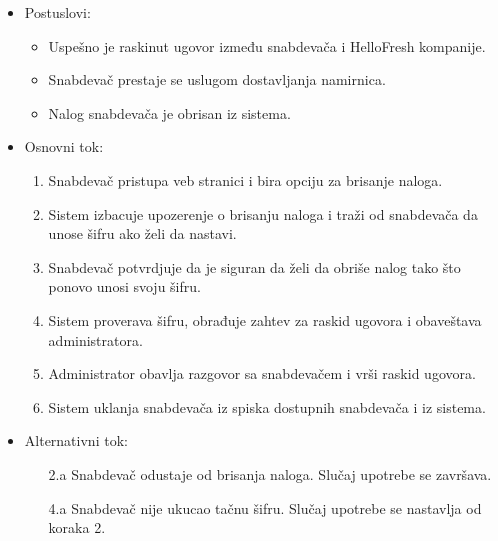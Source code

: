 \begin{itemize}
\begin{itemize}
        \end{itemize}
    \item Postuslovi:
        \begin{itemize}
            \item Uspešno je raskinut ugovor između snabdevača i HelloFresh kompanije.
            \item Snabdevač prestaje se uslugom dostavljanja namirnica.
            \item Nalog snabdevača je obrisan iz sistema.
        \end{itemize}
    \item Osnovni tok:
        \begin{enumerate}
            \item Snabdevač pristupa veb stranici i bira opciju za brisanje naloga.
            \item Sistem izbacuje upozerenje o brisanju naloga i traži od snabdevača da unose šifru ako želi da nastavi.
            \item Snabdevač potvrdjuje da je siguran da želi da obriše nalog tako što ponovo unosi svoju šifru.
            \item Sistem proverava šifru, obrađuje zahtev za raskid ugovora i obaveštava administratora.
            \item Administrator obavlja razgovor sa snabdevačem i vrši raskid ugovora.
            \item Sistem uklanja snabdevača iz spiska dostupnih snabdevača i iz sistema.
        \end{enumerate}
    \item Alternativni tok:
        \begin{itemize}
            \item[2.a] Snabdevač odustaje od brisanja naloga. Slučaj upotrebe se završava.
            \item[4.a] Snabdevač nije ukucao tačnu šifru. Slučaj upotrebe se nastavlja od koraka 2.
        \end{itemize}
\end{itemize}

